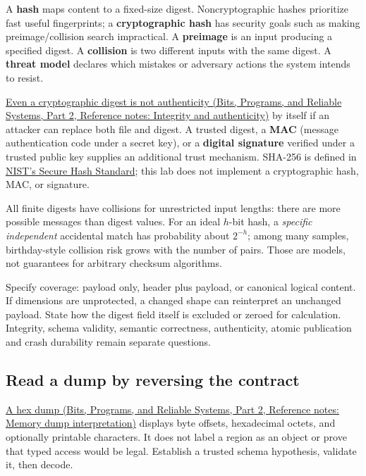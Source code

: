 A \textbf{hash} maps content to a fixed-size digest. Noncryptographic hashes prioritize fast useful fingerprints; a \textbf{cryptographic hash} has security goals such as making preimage/collision search impractical. A \textbf{preimage} is an input producing a specified digest. A \textbf{collision} is two different inputs with the same digest. A \textbf{threat model} declares which mistakes or adversary actions the system intends to resist.

\href{../01-Bits-Programs-and-Reliable-Systems-P02/main.pdf\#nameddest=appendix-cbe594d1ab0a}{Even a cryptographic digest is not authenticity (Bits, Programs, and Reliable Systems, Part 2, Reference notes: Integrity and authenticity)} by itself if an attacker can replace both file and digest. A trusted digest, a \textbf{MAC} (message authentication code under a secret key), or a \textbf{digital signature} verified under a trusted public key supplies an additional trust mechanism. SHA-256 is defined in \href{https://csrc.nist.gov/pubs/fips/180-4/upd1/final}{NIST's Secure Hash Standard}; this lab does not implement a cryptographic hash, MAC, or signature.

All finite digests have collisions for unrestricted input lengths: there are more possible messages than digest values. For an ideal \(h\)-bit hash, a \emph{specific independent} accidental match has probability about \(2^{-h}\); among many samples, birthday-style collision risk grows with the number of pairs. Those are models, not guarantees for arbitrary checksum algorithms.

Specify coverage: payload only, header plus payload, or canonical logical content. If dimensions are unprotected, a changed shape can reinterpret an unchanged payload. State how the digest field itself is excluded or zeroed for calculation. Integrity, schema validity, semantic correctness, authenticity, atomic publication and crash durability remain separate questions.

\subsection{Read a dump by reversing the contract}\label{05-engine-i-ch002-read-a-dump-by-reversing-the-contract}

\hypertarget{05-engine-i-ch002-read-a-dump-by-reversing-the-contract}{}

\href{../01-Bits-Programs-and-Reliable-Systems-P02/main.pdf\#nameddest=appendix-230b59c0676b}{A hex dump (Bits, Programs, and Reliable Systems, Part 2, Reference notes: Memory dump interpretation)} displays byte offsets, hexadecimal octets, and optionally printable characters. It does not label a region as an object or prove that typed access would be legal. Establish a trusted schema hypothesis, validate it, then decode.

